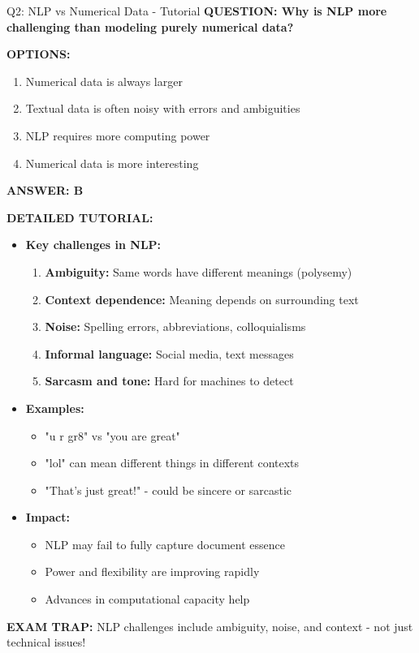 \documentclass[8pt]{beamer}
\begin{document}
	\begin{frame}{Q2: NLP vs Numerical Data - Tutorial}
		\fontsize{6.5}{7.5}\selectfont
		\textbf{QUESTION: Why is NLP more challenging than modeling purely numerical data?}
		
		\vspace{0.1cm}
		\textbf{OPTIONS:}
		\begin{enumerate}
			\item Numerical data is always larger
			\item Textual data is often noisy with errors and ambiguities
			\item NLP requires more computing power
			\item Numerical data is more interesting
		\end{enumerate}
		
		\vspace{0.1cm}
		\textcolor{myblue}{\textbf{ANSWER: B}}
		
		\vspace{0.1cm}
		\textbf{DETAILED TUTORIAL:}
		\begin{itemize}
			\item \textbf{Key challenges in NLP:}
			\begin{enumerate}
				\item \textbf{Ambiguity:} Same words have different meanings (polysemy)
				\item \textbf{Context dependence:} Meaning depends on surrounding text
				\item \textbf{Noise:} Spelling errors, abbreviations, colloquialisms
				\item \textbf{Informal language:} Social media, text messages
				\item \textbf{Sarcasm and tone:} Hard for machines to detect
			\end{enumerate}
			\item \textbf{Examples:}
			\begin{itemize}
				\item "u r gr8" vs "you are great"
				\item "lol" can mean different things in different contexts
				\item "That's just great!" - could be sincere or sarcastic
			\end{itemize}
			\item \textbf{Impact:}
			\begin{itemize}
				\item NLP may fail to fully capture document essence
				\item Power and flexibility are improving rapidly
				\item Advances in computational capacity help
			\end{itemize}
		\end{itemize}
		
		\textcolor{myred}{\textbf{EXAM TRAP:}} NLP challenges include \textcolor{myblue}{ambiguity, noise, and context} - not just technical issues!
	\end{frame}
	
\end{document}
